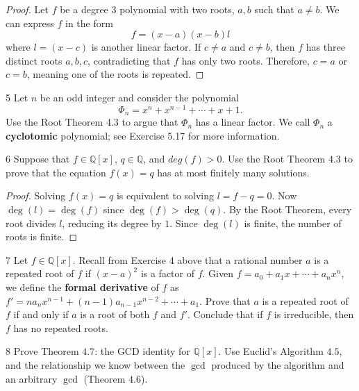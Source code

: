 \begin{proof}
    Let $f$ be a degree $3$ polynomial with two roots, $a, b$
        such that $a \ne b$.
    We can express $f$ in the form 
    \[f = (x - a)(x - b)l\]
    where $l = (x - c)$ is another linear factor.
    If $c \ne a$ and $c \ne b$, then $f$ has three distinct roots $a, b, c$,
        contradicting that $f$ has only two roots.
    Therefore, $c = a$ or $c = b$, meaning one of the roots is repeated.
\end{proof}

\begin{problem}{5}
    Let $n$ be an odd integer and consider the polynomial
    \[\Phi_n = x^n + x^{n - 1} + \cdots + x + 1.\]
    Use the Root Theorem 4.3 to argue that $\Phi_n$ has a linear factor. We call
    $\Phi_n$ a \textbf{cyclotomic} polynomial; see Exercise 5.17 for more information.
\end{problem}
\unsolved

\begin{problem}{6}
    Suppose that $f \in \mathbb{Q}[x]$, $q \in \mathbb{Q}$,
    and $deg(f) > 0$. Use the Root Theorem $4.3$ to prove that
    the equation $f(x) = q$ has at most finitely many solutions.
\end{problem}
\solved

\begin{proof}
    Solving $f(x) = q$ is equivalent to solving $l = f - q = 0$.
    Now $\deg(l) = \deg(f)$ since $\deg(f) > \deg(q)$.
    By the Root Theorem, every root divides $l$,
        reducing its degree by $1$.
    Since $\deg(l)$ is finite, the number of roots is 
        finite.
\end{proof}

\begin{problem}{7}
    Let $f \in \mathbb{Q}[x]$. Recall from Exercise 4 above that a rational number $a$ is
    a repeated root of $f$ if ${(x - a)}^2$ is a factor of $f$. Given
    $f = a_0 + a_1x + \cdots + a_nx^n$, we define the \textbf{formal derivative} of $f$
    as $f' = na_nx^{n - 1} + (n - 1)a_{n - 1}x^{n - 2} + \cdots + a_1$. Prove that $a$ is
    a repeated root of $f$ if and only if $a$ is a root of both $f$ and $f'$. Conclude
    that if $f$ is irreducible, then $f$ has no repeated roots.
\end{problem}
\unsolved

\begin{problem}{8}
    Prove Theorem $4.7$: the GCD identity for $\mathbb{Q}[x]$.
    Use Euclid's Algorithm $4.5$, and the relationship we know 
    between the $\gcd$ produced by the algorithm and an arbitrary $\gcd$ (Theorem $4.6$).
\end{problem}
\solved

